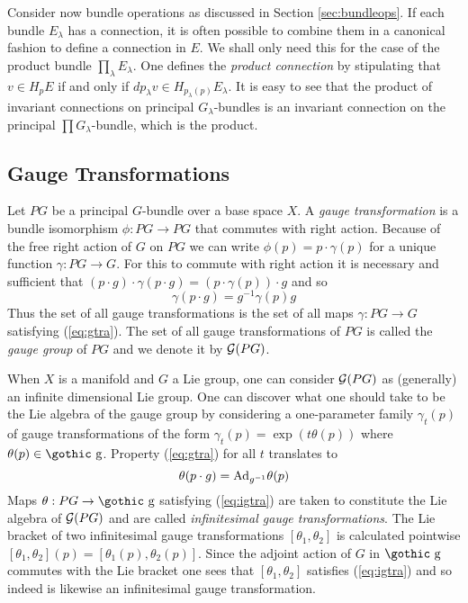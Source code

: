 \documentclass[12pt,titlepage]{article}
\def\goth#1{\hbox{\gothic #1}}
\def\cG{{\cal G}}
\def\gg{{\goth g}}
\def\Ad{\hbox{Ad}}
\begin{document}
Consider now  bundle operations as discussed in  
Section \ref{sec:bundleops}. 
If each bundle \(E_\lambda\) has a connection, it is often possible to 
combine them in a canonical fashion to define a connection in \(E\). 
We shall 
only need this for the case of the product bundle \(\prod_\lambda 
E_\lambda\). One defines the {\em product connection\/}
%
 by stipulating that 
\(v\in H_pE \) if and only if \(dp_\lambda v\in 
H_{p_\lambda(p)}E_\lambda\).
It is easy to see that the product of invariant connections on principal 
\(G_\lambda\)-bundles is an invariant connection on the  principal \(\prod 
G_\lambda\)-bundle, which is the product. 


\subsection{Gauge Transformations} \label{sec:gaugetra}
Let \(PG\) be a principal \(G\)-bundle over a base space \(X\).
A {\em gauge transformation\/}
%
is a bundle isomorphism \(\phi:PG \to PG\) that commutes with right
action. Because of the free right action of \(G\) on  \(PG\) we
can write \(\phi(p) = p\cdot\gamma(p)\) for a unique function
\(\gamma:PG \to G\). For this to commute with right action it is
necessary and sufficient that
\((p\cdot g)\cdot\gamma(p\cdot g) = (p \cdot \gamma(p))\cdot g\) and so
\begin{equation}\label{eq:gtra}
\gamma(p\cdot g) = g^{-1}\gamma(p)g
\end{equation}%
Thus the set of all gauge transformations is the set of all maps
\(\gamma:PG \to G\) satisfying (\ref{eq:gtra}).
The set of all gauge transformations of \(PG\) is called the {\em gauge
group\/}
%
 of \(PG\) and we denote it by \(\cG(PG)\).
\index{\(G(PG)\)@\(\cG(PG)\)}%

When \(X\) is a manifold and \(G\) a Lie group, one can consider
\(\cG(PG)\) as (generally) an infinite dimensional Lie group.
One can discover what
one should take to be the Lie algebra of the gauge group by considering
a one-parameter family
\(\gamma_t(p)\) of gauge transformations
of the form \(\gamma_t(p)= \exp(t\theta(p))\)  where
\(\theta(p)\in \gg\). Property (\ref{eq:gtra}) for all \(t\) translates to
\begin{equation}\label{eq:igtra}
\theta(p\cdot g) = \Ad_{g^{-1}}\theta(p)
\end{equation}%
Maps \(\theta:PG\to\gg\) satisfying (\ref{eq:igtra}) are taken to
constitute the Lie algebra of \(\cG(PG)\) and are called {\em
infinitesimal gauge transformations\/}.
%
  The Lie bracket of two
infinitesimal gauge transformations \([\theta_1,\theta_2]\) is
calculated pointwise  \([\theta_1,\theta_2](p) =
[\theta_1(p),\theta_2(p)]\). Since the adjoint action of \(G\) in
\(\gg\) commutes with the Lie bracket one sees that \(
[\theta_1,\theta_2] \) satisfies (\ref{eq:igtra}) and so  indeed
is likewise  an infinitesimal gauge transformation.
\end{document}
